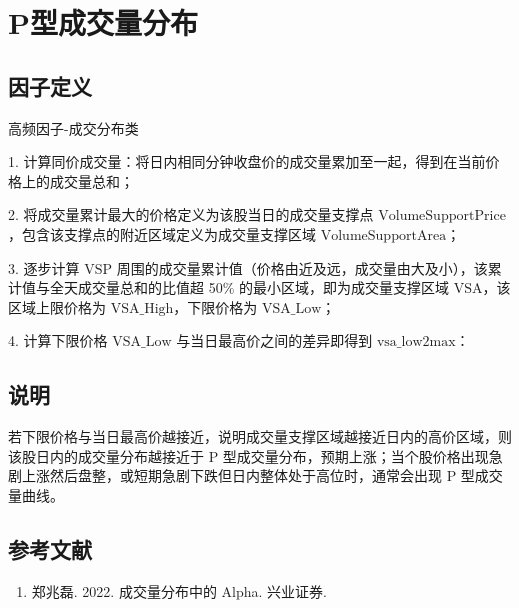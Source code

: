 \documentclass{article}
\begin{document}
\section{P型成交量分布}

\subsection{因子定义}
高频因子-成交分布类

1. 计算同价成交量：将日内相同分钟收盘价的成交量累加至一起，得到在当前价格上的成交量总和；

2. 将成交量累计最大的价格定义为该股当日的成交量支撑点 \( \mathrm{VolumeSupportPrice} \)，包含该支撑点的附近区域定义为成交量支撑区域 \( \mathrm{VolumeSupportArea} \)；

3. 逐步计算 \( \mathrm{VSP} \) 周围的成交量累计值（价格由近及远，成交量由大及小），该累计值与全天成交量总和的比值超 50\% 的最小区域，即为成交量支撑区域 \( \mathrm{VSA} \)，该区域上限价格为 \( \mathrm{VSA\_High} \)，下限价格为 \( \mathrm{VSA\_Low} \)；

4. 计算下限价格 \( \mathrm{VSA\_Low} \) 与当日最高价之间的差异即得到 \( \mathrm{vsa\_low2max} \)：


\subsection{说明}
若下限价格与当日最高价越接近，说明成交量支撑区域越接近日内的高价区域，则该股日内的成交量分布越接近于 P 型成交量分布，预期上涨；当个股价格出现急剧上涨然后盘整，或短期急剧下跌但日内整体处于高位时，通常会出现 P 型成交量曲线。

\subsection{参考文献}
\begin{enumerate}
    \item 郑兆磊. 2022. 成交量分布中的 Alpha. 兴业证券.
\end{enumerate}
\end{document}
